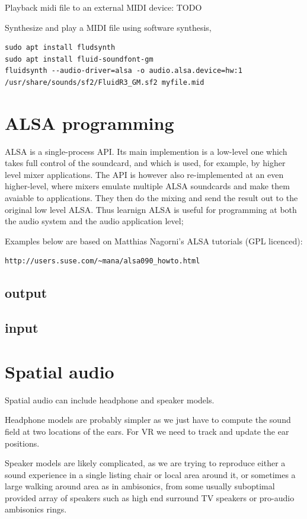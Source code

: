 \documentclass[oneside,english]{scrbook}
\begin{document}
Playback midi file to an external MIDI device:
TODO


Synthesize and play a MIDI file using software synthesis,
\begin{lstlisting}
sudo apt install fludsynth
sudo apt install fluid-soundfont-gm
fluidsynth --audio-driver=alsa -o audio.alsa.device=hw:1 /usr/share/sounds/sf2/FluidR3_GM.sf2 myfile.mid
\end{lstlisting}




\chapter{ALSA programming}

ALSA is a single-process API.  Its main implemention is a low-level one which takes full control of the soundcard, and which is used, for example, by higher level mixer applications.  The API is however also re-implemented at an even higher-level, where mixers emulate multiple ALSA soundcards and make them avaiable to applications.  They then do the mixing and send the result out to the original low level ALSA.  Thus learnign ALSA is useful for programming at both the audio system and the audio application level;

Examples below are based on Matthias Nagorni's ALSA tutorials (GPL licenced):
\begin{lstlisting}
http://users.suse.com/~mana/alsa090_howto.html
\end{lstlisting}

\section{output}


\section{input}

\chapter{Spatial audio}

Spatial audio can include headphone and speaker models.   

Headphone models are probably simpler as we just have to compute the sound field at two locations of the ears.  For VR we need to track and update the ear positions. 

Speaker models are likely complicated, as we are trying to reproduce either a sound experience in a single listing chair or local area around it, or sometimes a large walking around area as in ambisonics, from some usually suboptimal provided array of speakers such as high end surround TV speakers or pro-audio ambisonics rings.
\end{document}
